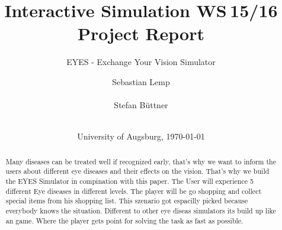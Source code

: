 \documentclass{acm_proc_article-sp}
\begin{document}
\title{
Interactive Simulation WS 15/16\\ %
Project Report
}
\subtitle{EYES - Exchange Your Vision Simulator}
\author{
\alignauthor
Sebastian Lemp\\
       \\
\alignauthor
Stefan Büttner\\
       \\
}

\date{University of Augsburg, \today}




\maketitle
\begin{abstract}
Many diseases can be treated well if recognized early, that's why we want to inform the users about different eye diseases and their effects on the vision. That's why we build the EYES Simulator in compination with this paper. The User will experience 5 different Eye diseases in different levels. The player will be go shopping and collect special items from his shopping list. This szenario got espacilly picked because everybody knows the situation. Different to other eye diseas simulators its build up like an game. Where the player gets point for solving the task as fast as possible. 
\end{abstract}
\end{document}
